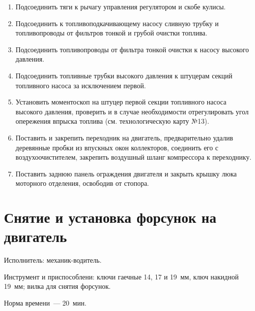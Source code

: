 \begin{enumerate}
    Зазор между торцами кулачков ведущей полумуфты и передним концом муфты опережения, так же, как и зазор между кулачками муфты опережения и задним торцом ведущей полумуфты должен быть не менее 0,3~мм. 
        
    Проверка обязательна для всех четырех кулачков. 
    \item Подсоединить тяги к рычагу управления регулятором и скобе кулисы. 
    \item Подсоединить к топливоподкачивающему насосу сливную трубку и топливопроводы от фильтров тонкой и грубой очистки топлива. 
    \item Подсоединить топливопроводы от фильтра тонкой очистки к насосу высокого давления. 
    \item Подсоединить топливные трубки высокого давления к штуцерам секций топливного насоса за исключением первой. 
    \item Установить моментоскоп на штуцер первой секции топливного насоса высокого давления, проверить и в случае необходимости отрегулировать угол опережения впрыска топлива (см. технологическую карту №13).  
    \item Поставить и закрепить переходник на двигатель, предварительно удалив деревянные пробки из впускных окон коллекторов, соединить его с воздухоочистителем, закрепить воздушный шланг компрессора к переходнику.  
    \item Поставить заднюю панель ограждения двигателя и закрыть крышку люка моторного отделения, освободив от стопора. 
\end{enumerate}


\section{Снятие и установка форсунок на двигатель}
Исполнитель: механик-водитель. 

Инструмент и приспособлени: ключи гаечные 14, 17 и 19~мм, ключ накидной 19~мм; вилка для снятия форсунок. 

Норма времени~--- 20~мин. 

